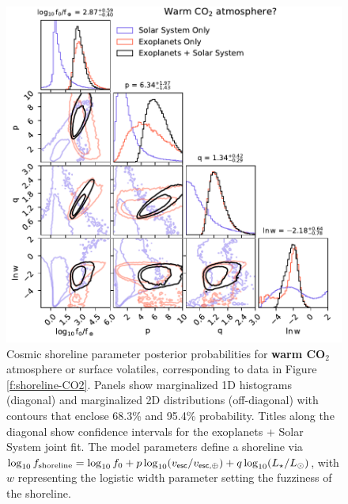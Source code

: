 \documentclass[modern,linenumbers,trackchanges]{aastex7}
\begin{document}
\begin{figure}[ht!]
\includegraphics[width=\textwidth]{figures/posteriors-CO2.pdf}

\caption{Cosmic shoreline parameter posterior probabilities for {\bf warm CO$_2$} atmosphere or surface volatiles, corresponding to data in Figure \ref{f:shoreline-CO2}. Panels show marginalized 1D histograms (diagonal) and marginalized 2D distributions (off-diagonal) with contours that enclose 68.3\% and 95.4\% probability. Titles along the diagonal show confidence intervals for the exoplanets + Solar System joint fit. The model parameters define a shoreline via $\log_{10} f_{\rm shoreline} = \log_{10} f_{0} + p \log_{10} (v_{\sf esc}/v_{\sf esc, \oplus}) + q \log_{10} (L_\star/L_\odot)$, with $w$ representing the logistic width parameter setting the fuzziness of the shoreline.}
\label{f:posteriors-CO2}
\end{figure}
\end{document}
